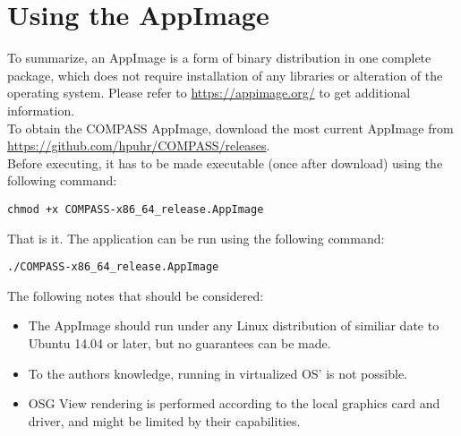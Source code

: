 \section{Using the AppImage}

To summarize, an AppImage is a form of binary distribution in one complete package, which does not require installation of any libraries or alteration of the operating system. Please refer to \url{https://appimage.org/} to get additional information. \\

To obtain the COMPASS AppImage, download the most current AppImage from \url{https://github.com/hpuhr/COMPASS/releases}. \\

Before executing, it has to be made executable (once after download) using the following command:
\begin{lstlisting}
chmod +x COMPASS-x86_64_release.AppImage
\end{lstlisting}

That is it. The application can be run using the following command:
\begin{lstlisting}
./COMPASS-x86_64_release.AppImage
\end{lstlisting}

The following notes that should be considered:

\begin{itemize}  
\item The AppImage should run under any Linux distribution of similiar date to Ubuntu 14.04 or later, but no guarantees can be made.
\item To the authors knowledge, running in virtualized OS' is not possible.
\item OSG View rendering is performed according to the local graphics card and driver, and might be limited by their capabilities.
\end{itemize} 
